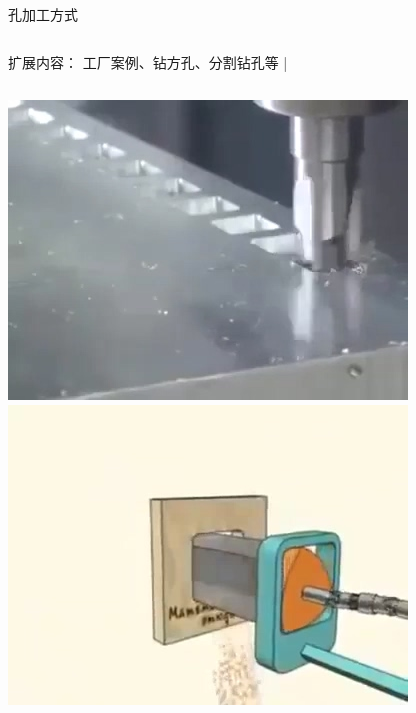 \documentclass[utf8,zihao=-4,handout,smaller,aspectratio=1610]{ctexbeamer}
\begin{document}
\begin{frame}{孔加工方式}
	\begin{columns}
		\begin{block}{扩展内容：}
			工厂案例、钻方孔、分割钻孔等
			|\end{block}
	\end{columns}
	
	\vspace{25pt}
	
	\includegraphics[width=0.5\linewidth,trim=0 0 0 0,clip,angle=0]{image/zuanfangkong.jpg}~
	\includegraphics[width=0.5\linewidth,trim=0 0 0 0,clip,angle=0]{image/zuanfangkongyuanli.jpg}
	
\end{frame}
\end{document}
